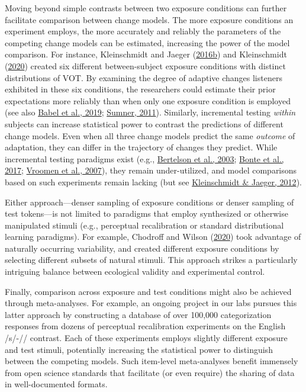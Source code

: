 \documentclass[
  11pt,
  man,floatsintext]{apa6}
\begin{document}
Moving beyond simple contrasts between two exposure conditions can further facilitate comparison between change models. The more exposure conditions an experiment employs, the more accurately and reliably the parameters of the competing change models can be estimated, increasing the power of the model comparison. For instance, Kleinschmidt and Jaeger (\protect\hyperlink{ref-kleinschmidt-jaeger2016cogsci}{2016b}) and Kleinschmidt (\protect\hyperlink{ref-kleinschmidt2020}{2020}) created six different between-subject exposure conditions with distinct distributions of VOT. By examining the degree of adaptive changes listeners exhibited in these six conditions, the researchers could estimate their prior expectations more reliably than when only one exposure condition is employed (see also \protect\hyperlink{ref-babel2019}{Babel et al., 2019}; \protect\hyperlink{ref-sumner2011}{Sumner, 2011}). Similarly, incremental testing \emph{within} subjects can increase statistical power to contrast the predictions of different change models. Even when all three change models predict the same \emph{outcome} of adaptation, they can differ in the trajectory of changes they predict. While incremental testing paradigms exist (e.g., \protect\hyperlink{ref-bertelson2003}{Bertelson et al., 2003}; \protect\hyperlink{ref-bonte2017}{Bonte et al., 2017}; \protect\hyperlink{ref-vroomen2007}{Vroomen et al., 2007}), they remain under-utilized, and model comparisons based on such experiments remain lacking (but see \protect\hyperlink{ref-kleinschmidt-jaeger2012}{Kleinschmidt \& Jaeger, 2012}).

Either approach---denser sampling of exposure conditions or denser sampling of test tokens---is not limited to paradigms that employ synthesized or otherwise manipulated stimuli (e.g., perceptual recalibration or standard distributional learning paradigms). For example, Chodroff and Wilson (\protect\hyperlink{ref-chodroff-wilson2020}{2020}) took advantage of naturally occurring variability, and created different exposure conditions by selecting different subsets of natural stimuli. This approach strikes a particularly intriguing balance between ecological validity and experimental control.

Finally, comparison across exposure and test conditions might also be achieved through meta-analyses. For example, an ongoing project in our labs pursues this latter approach by constructing a database of over 100,000 categorization responses from dozens of perceptual recalibration experiments on the English /s/-// contrast. Each of these experiments employs slightly different exposure and test stimuli, potentially increasing the statistical power to distinguish between the competing models. Such item-level meta-analyses benefit immensely from open science standards that facilitate (or even require) the sharing of data in well-documented formats.
\end{document}
